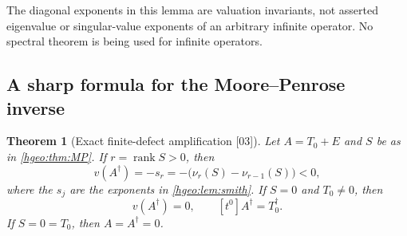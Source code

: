 \documentclass[11pt,letterpaper]{article}
\numberwithin{equation}{section}
\newtheorem{theorem}{Theorem}[section]
\theoremstyle{definition}
\theoremstyle{remark}
\newcommand{\rank}{\operatorname{rank}}
\newcommand{\src}[1]{\textup{\textsf{\small[#1]}}}
\begin{document}
The diagonal exponents in this lemma are valuation invariants, not
asserted eigenvalue or singular-value exponents of an arbitrary
infinite operator. No spectral theorem is being used for infinite operators.

\subsection{A sharp formula for the Moore--Penrose inverse}

\begin{theorem}[Exact finite-defect amplification \src{03}]\label{hgeo:thm:scale}
Let $A=T_0+E$ and $S$ be as in \cref{hgeo:thm:MP}. If
$r=\rank S>0$, then
\begin{equation}\label{hgeo:eq:scale}
 v(A^\dagger)=-s_r
       =-\bigl(\nu_r(S)-\nu_{r-1}(S)\bigr)<0,
\end{equation}
where the $s_j$ are the exponents in \cref{hgeo:lem:smith}.
If $S=0$ and $T_0\ne0$, then
\begin{equation}\label{hgeo:eq:nolift}
 v(A^\dagger)=0,
 \qquad [t^0]A^\dagger=T_0^\dagger.
\end{equation}
If $S=0=T_0$, then $A=A^\dagger=0$.
\end{theorem}
\end{document}
